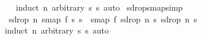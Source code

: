 \begin{isabellebody}
%
\isadelimproof
\ \ %
\endisadelimproof
%
\isatagproof
{}\isamarkupfalse%
\ {\isacharparenleft}induct\ n\ arbitrary{\isacharcolon}\ s{}\ s{}{\isacharparenright}\ auto%
\endisatagproof
{\isafoldproof}%
%
\isadelimproof
\isanewline
%
\endisadelimproof
\isanewline
{}\isamarkupfalse%
\ sdrop{\isacharunderscore}smap{}{\isacharbrackleft}simp{\isacharbrackright}{\isacharcolon}\isanewline
\ \ {\isachardoublequoteopen}sdrop\ n\ {\isacharparenleft}smap{}\ f\ s{}\ s{}{\isacharparenright}\ {\isacharequal}\ smap{}\ f\ {\isacharparenleft}sdrop\ n\ s{}{\isacharparenright}\ {\isacharparenleft}sdrop\ n\ s{}{\isacharparenright}{\isachardoublequoteclose}\isanewline
%
\isadelimproof
\ \ %
\endisadelimproof
%
\isatagproof
{}\isamarkupfalse%
\ {\isacharparenleft}induct\ n\ arbitrary{\isacharcolon}\ s{}\ s{}{\isacharparenright}\ auto%
\endisatagproof
{\isafoldproof}%
%
\isadelimproof
\isanewline
%
\endisadelimproof
%
\isadelimtheory
\isanewline
%
\endisadelimtheory
%
\isatagtheory
{}\isamarkupfalse%
%
\endisatagtheory
{\isafoldtheory}%
%
\isadelimtheory
%
\endisadelimtheory
%
\end{isabellebody}%
\endinput
